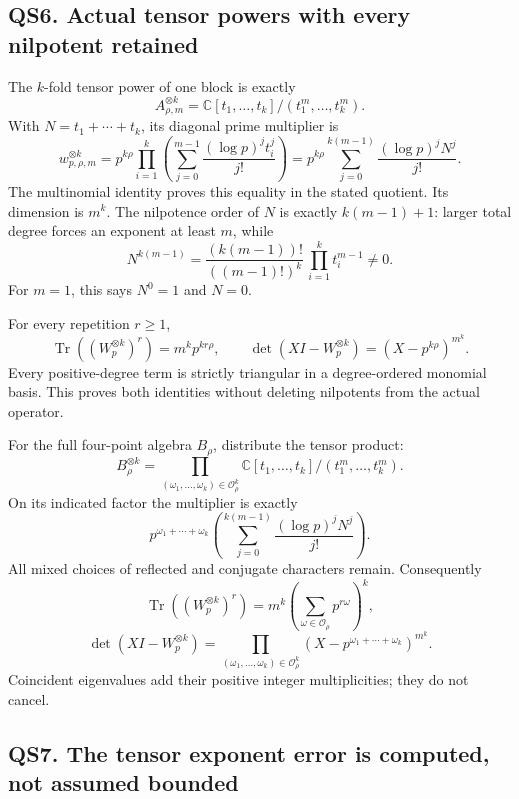 \subsection{QS6. Actual tensor powers with every nilpotent
retained}\label{qs6.-actual-tensor-powers-with-every-nilpotent-retained}

The \(k\)-fold tensor power of one block is exactly \[
A_{\rho,m}^{\otimes k}
=\mathbb C[t_1,\ldots,t_k]/(t_1^m,\ldots,t_k^m).
\tag{QS6.1}
\] With \(N=t_1+\cdots+t_k\), its diagonal prime multiplier is \[
w_{p,\rho,m}^{\otimes k}
=p^{k\rho}\prod_{i=1}^k\left(\sum_{j=0}^{m-1}
\frac{(\log p)^jt_i^j}{j!}\right)
=p^{k\rho}\sum_{j=0}^{k(m-1)}\frac{(\log p)^jN^j}{j!}.
\tag{QS6.2}
\] The multinomial identity proves this equality in the stated quotient.
Its dimension is \(m^k\). The nilpotence order of \(N\) is exactly
\(k(m-1)+1\): larger total degree forces an exponent at least \(m\),
while \[
N^{k(m-1)}
=\frac{(k(m-1))!}{((m-1)!)^k}
\,\prod_{i=1}^k t_i^{m-1}\ne0.
\tag{QS6.3}
\] For \(m=1\), this says \(N^0=1\) and \(N=0\).

For every repetition \(r\ge1\), \[
\operatorname{Tr}((W_p^{\otimes k})^r)=m^kp^{kr\rho},
\qquad
\det(XI-W_p^{\otimes k})=(X-p^{k\rho})^{m^k}.
\tag{QS6.4}
\] Every positive-degree term is strictly triangular in a degree-ordered
monomial basis. This proves both identities without deleting nilpotents
from the actual operator.

For the full four-point algebra \(B_\rho\), distribute the tensor
product: \[
B_\rho^{\otimes k}
=\prod_{(\omega_1,\ldots,\omega_k)\in\mathcal O_\rho^k}
\mathbb C[t_1,\ldots,t_k]/(t_1^m,\ldots,t_k^m).
\tag{QS6.5}
\] On its indicated factor the multiplier is exactly \[
p^{\omega_1+\cdots+\omega_k}
\left(\sum_{j=0}^{k(m-1)}\frac{(\log p)^jN^j}{j!}\right).
\tag{QS6.6}
\] All mixed choices of reflected and conjugate characters remain.
Consequently \[
\operatorname{Tr}((W_p^{\otimes k})^r)
=m^k\left(\sum_{\omega\in\mathcal O_\rho}p^{r\omega}\right)^k,
\tag{QS6.7}
\] \[
\det(XI-W_p^{\otimes k})
=\prod_{(\omega_1,\ldots,\omega_k)\in\mathcal O_\rho^k}
\left(X-p^{\omega_1+\cdots+\omega_k}\right)^{m^k}.
\tag{QS6.8}
\] Coincident eigenvalues add their positive integer multiplicities;
they do not cancel.

\subsection{QS7. The tensor exponent error is computed, not assumed
bounded}\label{qs7.-the-tensor-exponent-error-is-computed-not-assumed-bounded}

